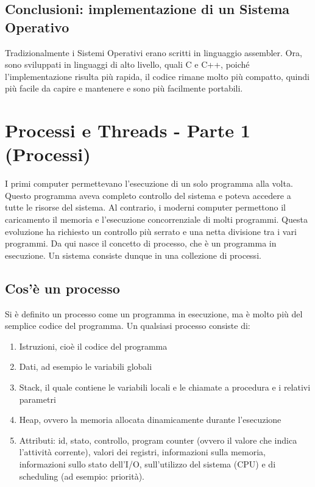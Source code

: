 \documentclass[a4paper]{article}
\begin{document}
\subsection{Conclusioni: implementazione di un Sistema Operativo}
Tradizionalmente i Sistemi Operativi erano scritti in linguaggio assembler. Ora, sono sviluppati in linguaggi di alto livello, quali C e C++, poiché l'implementazione risulta più rapida, il codice rimane molto più compatto, quindi più facile da capire e mantenere e sono più facilmente portabili.

\newpage
\section{Processi e Threads - Parte 1 (Processi)}

I primi computer permettevano l'esecuzione di un solo programma alla volta. Questo programma aveva completo controllo del sistema e poteva accedere a tutte le risorse del sistema. Al contrario, i moderni computer permettono il caricamento il memoria e l'esecuzione concorrenziale di molti programmi. Questa evoluzione ha richiesto un controllo più serrato e una netta divisione tra i vari programmi. Da qui nasce il concetto di processo, che è un programma in esecuzione. Un sistema consiste dunque in una collezione di processi.

\subsection{Cos'è un processo}
Si è definito un processo come un programma in esecuzione, ma è molto più del semplice codice del programma. Un qualsiasi processo consiste di:
\begin{enumerate}
   \item Istruzioni, cioè il codice del programma
   \item Dati, ad esempio le variabili globali
   \item Stack, il quale contiene le variabili locali e le chiamate a procedura e i relativi parametri
   \item Heap, ovvero la memoria allocata dinamicamente durante l'esecuzione
   \item Attributi: id, stato, controllo, program counter (ovvero il valore che indica l'attività corrente), valori dei registri, informazioni sulla memoria, informazioni sullo stato dell'I/O, sull'utilizzo del sistema (CPU) e di scheduling (ad esempio: priorità).
\end{enumerate}
\end{document}
